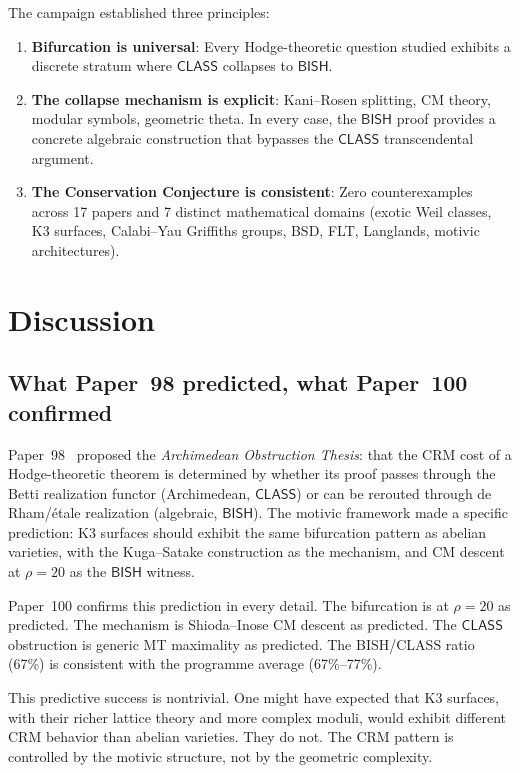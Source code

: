 \documentclass[11pt,a4paper]{article}
\theoremstyle{plain}
\theoremstyle{definition}
\newcommand{\BISH}{\textsf{BISH}}
\newcommand{\CLASS}{\textsf{CLASS}}
\begin{document}
The campaign established three principles:
\begin{enumerate}[label=(\arabic*)]
  \item \textbf{Bifurcation is universal}: Every Hodge-theoretic question studied exhibits a discrete stratum where $\CLASS$ collapses to $\BISH$.
  \item \textbf{The collapse mechanism is explicit}: Kani--Rosen splitting, CM theory, modular symbols, geometric theta. In every case, the $\BISH$ proof provides a concrete algebraic construction that bypasses the $\CLASS$ transcendental argument.
  \item \textbf{The Conservation Conjecture is consistent}: Zero counterexamples across 17 papers and 7 distinct mathematical domains (exotic Weil classes, K3 surfaces, Calabi--Yau Griffiths groups, BSD, FLT, Langlands, motivic architectures).
\end{enumerate}


\section{Discussion}\label{sec:discussion}

\subsection{What Paper~98 predicted, what Paper~100 confirmed}

Paper~98~\cite{lee-p98} proposed the \emph{Archimedean Obstruction Thesis}: that the CRM cost of a Hodge-theoretic theorem is determined by whether its proof passes through the Betti realization functor (Archimedean, $\CLASS$) or can be rerouted through de Rham/\'etale realization (algebraic, $\BISH$). The motivic framework made a specific prediction: K3 surfaces should exhibit the same bifurcation pattern as abelian varieties, with the Kuga--Satake construction as the mechanism, and CM descent at $\rho = 20$ as the $\BISH$ witness.

Paper~100 confirms this prediction in every detail. The bifurcation is at $\rho = 20$ as predicted. The mechanism is Shioda--Inose CM descent as predicted. The $\CLASS$ obstruction is generic MT maximality as predicted. The BISH/CLASS ratio (67\%) is consistent with the programme average (67\%--77\%).

This predictive success is nontrivial. One might have expected that K3 surfaces, with their richer lattice theory and more complex moduli, would exhibit different CRM behavior than abelian varieties. They do not. The CRM pattern is controlled by the motivic structure, not by the geometric complexity.
\end{document}
